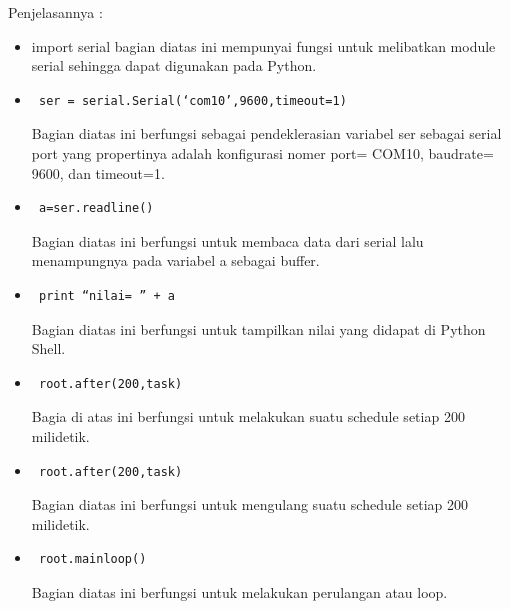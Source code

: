 		Penjelasannya : 
		\begin{itemize}
			\item import serial
			bagian diatas ini mempunyai fungsi untuk melibatkan module serial sehingga dapat digunakan pada Python.
			
			\item \begin{verbatim} ser = serial.Serial(‘com10’,9600,timeout=1)\end{verbatim}
			Bagian diatas ini berfungsi sebagai pendeklerasian variabel ser sebagai serial port yang propertinya adalah konfigurasi nomer port= COM10, baudrate= 9600, dan timeout=1.
			\item \begin{verbatim} a=ser.readline() \end{verbatim}
			Bagian diatas ini berfungsi untuk membaca data dari serial lalu menampungnya pada variabel a sebagai buffer.
			\item \begin{verbatim} print “nilai= ” + a \end{verbatim} 
			Bagian diatas ini berfungsi untuk tampilkan nilai yang didapat di Python Shell. 
			\item \begin{verbatim} root.after(200,task) \end{verbatim}
			Bagia di atas ini berfungsi untuk melakukan suatu schedule setiap 200 milidetik.
			\item \begin{verbatim} root.after(200,task)	\end{verbatim}
			Bagian diatas ini berfungsi untuk mengulang suatu schedule setiap 200 milidetik.
			\item \begin{verbatim} root.mainloop() \end{verbatim}
			Bagian diatas ini berfungsi untuk melakukan perulangan atau loop.
		\end{itemize}
	
	\cite{nurjanahhack}
	\cite{rossum1995python}
	\cite{chun2001core}
